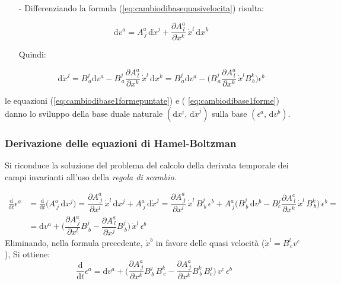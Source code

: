 \documentclass[11pt]{report}
\theoremstyle{plain}
\theoremstyle{definition}
\theoremstyle{remark}
\begin{document}
\begin{itemize}
\item[-]
Differenziando la formula (\ref{eq:cambiodibasequasivelocita}) risulta:

\begin{displaymath}
\textrm{d} v^{a} = A^{a}_{\,j} \, \textrm{d} \dot{x}^{j} + \dfrac{\partial A^{a}_{\,l}}{\partial x^{k}}\, \dot{x}^{l} \, \textrm{d} x^{k}
\end{displaymath}

Quindi:

\begin{equation}\label{eq:cambiodibase1formepuntate}
\textrm{d}\dot{x}^{j} = B^{j}_{\,a} \textrm{d} v^{a} - B^{j}_{\,a}\dfrac{\partial A^{a}_{\,l}}{\partial x^{k}}\, \dot{x}^{l} \, \textrm{d} x^{k} = B^{j}_{\,a} \textrm{d} v^{a} - \Bigr(B^{j}_{\,a}  \dfrac{\partial A^{a}_{\,l}}{\partial x^{k}}\, \dot{x}^{l} B^{k}_{\, b} \Bigr) \epsilon^{b} 
\end{equation}

\end{itemize}
le equazioni (\ref{eq:cambiodibase1formepuntate}) e ( \ref{eq:cambiodibase1forme}) danno lo sviluppo della base duale naturale $(\textrm{d}x^{i}, \, \textrm{d}\dot{x}^{j}) $ sulla base $(\epsilon^{a} , \, \textrm{d}v^{b}) $.




\subsubsection{Derivazione delle equazioni di Hamel-Boltzman}
Si riconduce la soluzione del problema del calcolo della derivata temporale dei campi invarianti all'uso della \emph{regola di scambio}.

\begin{displaymath}\begin{split}
\frac{\textrm{d}}{\textrm{d}t} \epsilon^{a} & = \frac{\textrm{d}}{\textrm{d}t}\Bigr( A^{a}_{\: j}\, \textrm{d}x^{j} \Bigr) = \dfrac{\partial A^{a}_{\: j}}{\partial x^{l}}\, \dot{x}^{l}\, \textrm{d}x^{j} + A^{a}_{\: j}\, \textrm{d}\dot{x}^{j} =
\dfrac{\partial A^{a}_{\: j}}{\partial x^{l}}\, \dot{x}^{l}\, B^{j}_{\: b}\, \epsilon^{b} + A^{a}_{\: j} \Bigr( B^{j}_{\: b} \, \textrm{d}v^{b} - B^{j}_{c} \dfrac{\partial A^{c}_{\: l}}{\partial x^{k}}\, \dot{x}^{l} \, B^{k}_{\: b}\Bigr)\, \epsilon^{b} = \\ & =
\textrm{d} v^{a} + \Bigr( \dfrac{\partial A^{a}_{\:j}}{\partial x^{l}}B^{j}_{\: b} -   \dfrac{\partial A^{a}_{\: l}}{\partial x^{j}}B^{j}_{\: b}\Bigr)\, \dot{x}^{l} \, \epsilon^{b}
\end{split}\end{displaymath}
Eliminando, nella formula precedente, $\dot{x}^{b}$ in favore delle quasi velocità ($\dot{x}^{l} = B^{l}_{\,c} v^{c}$), Si ottiene:
\begin{displaymath}
\dfrac{\textrm{d}}{\textrm{d}t} \epsilon^{a} = \textrm{d}v^{a} + \Bigr( \dfrac{ \partial A^{a}_{\,j}}{\partial x^{k}} B^{j}_{\,b}\,B^{k}_{\:c} -
\dfrac{\partial A^{a}_{\,j}}{\partial x^{k}} B^{k}_{\,b}\,B^{j}_{c} \Bigr)\, v^{c} \, \epsilon^{b}
\end{displaymath}
\end{document}
